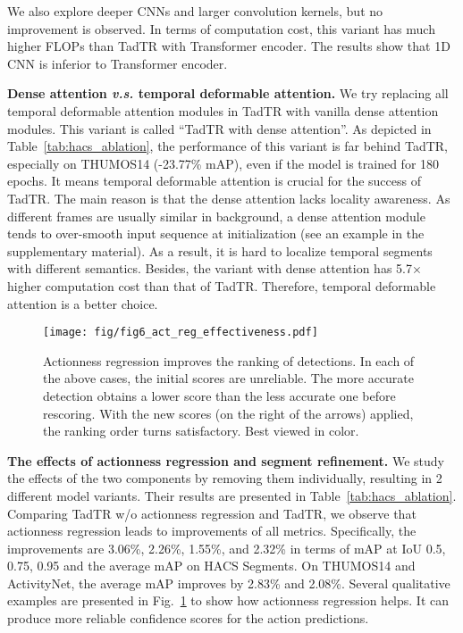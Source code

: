 \documentclass[lettersize,journal]{IEEEtran}
\begin{document}
We also explore deeper CNNs and larger convolution kernels, but no improvement is observed.
In terms of computation cost, this variant has much higher FLOPs than TadTR with Transformer encoder. 
The results show that 1D CNN is inferior to Transformer encoder.


\vspace{1ex}\noindent\textbf{Dense attention \textit{v.s.} temporal deformable attention.} We try replacing all temporal deformable attention modules in TadTR with vanilla dense attention modules. This variant is called ``TadTR with dense attention''. As depicted in Table~\ref{tab:hacs_ablation}, the performance of this variant is far behind TadTR, especially on THUMOS14 (-23.77\% mAP), even if the model is trained for 180 epochs. It means temporal deformable attention is crucial for the success of TadTR.
The main reason is that the dense attention lacks locality awareness. 
As different frames are usually similar in background, a dense attention module tends to over-smooth input sequence at initialization (see an example in the supplementary material). As a result, it is hard to localize temporal segments with different semantics. 
Besides, the variant with dense attention has 5.7$\times$ higher computation cost than that of TadTR.
Therefore, temporal deformable attention is a better choice.


\begin{figure}[tb]
\centering
\texttt{[image: fig/fig6\_act\_reg\_effectiveness.pdf]}
\caption{Actionness regression improves the ranking of detections. In each of the above cases, the initial scores are unreliable. The more accurate detection obtains a lower score than the less accurate one before rescoring. With the new scores (on the right of the arrows) applied, the ranking order turns satisfactory. Best viewed in color.
}
\label{fig:qualitative}
\end{figure}

\vspace{1ex}\noindent\textbf{The effects of actionness regression and segment refinement.}
We study the effects of the two components by removing them individually, resulting in 2 different model variants. Their results are presented in Table~\ref{tab:hacs_ablation}. 
Comparing TadTR w/o actionness regression and TadTR, we observe that  actionness regression leads to improvements of all metrics. 
Specifically, the improvements are 3.06\%,  2.26\%, 1.55\%, and 2.32\% in terms of mAP at IoU 0.5, 0.75, 0.95 and the average mAP on HACS Segments. On THUMOS14 and ActivityNet, the average mAP improves by 2.83\% and 2.08\%. Several qualitative examples are presented in Fig.~\ref{fig:qualitative} to show how actionness regression helps. It can produce more reliable confidence scores for the action predictions.
\end{document}
